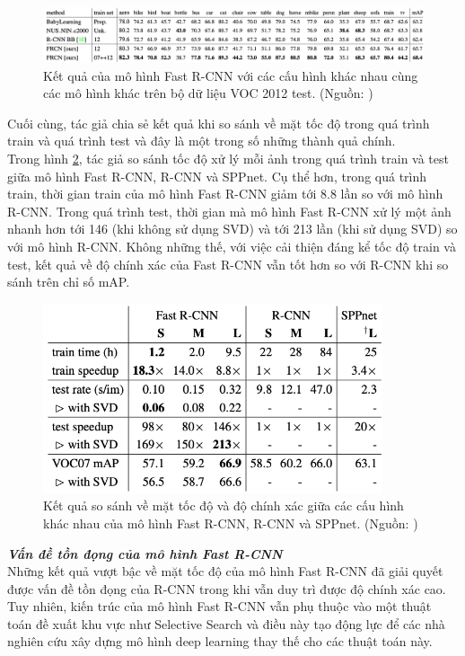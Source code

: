 {    \begin{figure}[H]
        \centering
        \includegraphics[width=15cm] {images/fast_rcnn_results_3}
        \caption{Kết quả của mô hình Fast R-CNN với các cấu hình khác nhau cùng các mô hình khác trên bộ dữ liệu VOC 2012 test. (Nguồn: \cite{girshick2015fast})}
        \label{fig:fast_rcnn_results_3}
    \end{figure}

    \noindent
    Cuối cùng, tác giả chia sẻ kết quả khi so sánh về mặt tốc độ trong quá trình train và quá trình test và đây là một trong số những thành quả chính. \\
    Trong hình \ref{fig:fast_rcnn_results_4}, tác giả so sánh tốc độ xử lý mỗi ảnh trong quá trình train và test giữa mô hình Fast R-CNN, R-CNN và SPPnet.
    Cụ thể hơn, trong quá trình train, thời gian train của mô hình Fast R-CNN giảm tới 8.8 lần so với mô hình R-CNN.
    Trong quá trình test, thời gian mà mô hình Fast R-CNN xử lý một ảnh nhanh hơn tới 146 (khi không sử dụng SVD) và tới 213 lần (khi sử dụng SVD) so với mô hình R-CNN.
    Không những thế, với việc cải thiện đáng kể tốc độ train và test, kết quả về độ chính xác của Fast R-CNN vẫn tốt hơn so với R-CNN khi so sánh trên chỉ số mAP.

    \begin{figure}[H]
        \centering
        \includegraphics[width=10cm] {images/fast_rcnn_results_4}
        \caption{Kết quả so sánh về mặt tốc độ và độ chính xác giữa các cấu hình khác nhau của mô hình Fast R-CNN, R-CNN và SPPnet. (Nguồn: \cite{girshick2015fast})}
        \label{fig:fast_rcnn_results_4}
    \end{figure}

    \noindent
    \textbf{\textit{Vấn đề tồn đọng của mô hình Fast R-CNN}} \\
    Những kết quả vượt bậc về mặt tốc độ của mô hình Fast R-CNN đã giải quyết được vấn đề tồn đọng của R-CNN trong khi vẫn duy trì được độ chính xác cao.
    Tuy nhiên, kiến trúc của mô hình Fast R-CNN vẫn phụ thuộc vào một thuật toán đề xuất khu vực như Selective Search và điều này tạo động lực để các nhà nghiên cứu xây dựng mô hình deep learning thay thế cho các thuật toán này.
}